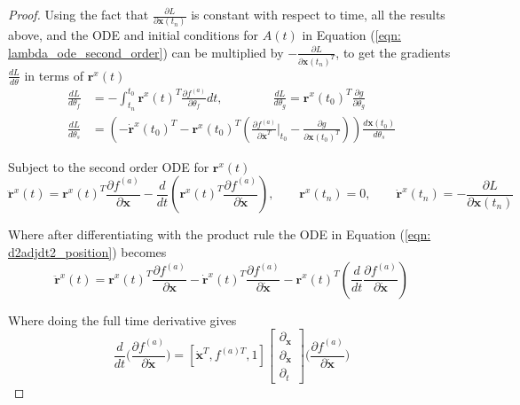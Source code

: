 \documentclass{article}
\theoremstyle{remark}
\theoremstyle{definition}
\begin{document}
\begin{proof}
Using the fact that $\displaystyle  \frac{\partial L}{\partial \mathbf{x}(t_{n})}$ is constant with respect to time, all the results above, and the ODE and initial conditions for $A(t)$ in Equation (\ref{eqn: lambda_ode_second_order}) can be multiplied by $\displaystyle -\frac{\partial L}{\partial \mathbf{x}(t_{n})^{T}}$, to get the gradients $\displaystyle  \frac{dL}{d\theta}$ in terms of $\mathbf{r}^{x}(t)$
\begin{equation}
\label{eqn: gradients_second_order_positional}
\begin{aligned}
    \frac{dL}{d\theta_{f}} &= -\int_{t_{n}}^{t_{0}}\mathbf{r}^{x}(t)^{T}
    \frac{\partial f^{(a)}}{\partial \theta_{f}}dt
    ,\qquad\qquad
    \frac{dL}{d\theta_{g}} = \mathbf{r}^{x}(t_{0})^{T}\frac{\partial g}{\partial \theta_{g}}
    \\
    \frac{dL}{d\theta_{s}} &=  \left(
    -\dot{\mathbf{r}}^{x}(t_{0})^{T} 
    - \mathbf{r}^{x}(t_{0})^{T}
    \left(
    \frac{\partial f^{(a)}}{\partial \dot{\mathbf{x}}^{T}}\Biggr\vert_{t_{0}}
    - \frac{\partial g}{\partial \mathbf{x}(t_{0})^{T}}
    \right)
    \right)\frac{d\mathbf{x}(t_{0})}{d\theta_{s}}
\end{aligned}
\end{equation}

Subject to the second order ODE for $\mathbf{r}^{x}(t)$
\begin{equation}
\label{eqn: d2adjdt2_position}
    \ddot{\mathbf{r}}^{x}(t) = \mathbf{r}^{x}(t)^{T}\frac{\partial f^{(a)}}{\partial \mathbf{x}} - \frac{d}{dt}\left(
    \mathbf{r}^{x}(t)^{T}\frac{\partial f^{(a)}}{\partial \dot{\mathbf{x}}}
    \right)
    ,\qquad
    \mathbf{r}^{x}(t_{n}) = 0
    ,\qquad
    \dot{\mathbf{r}}^{x}(t_{n}) = -\frac{\partial L}{\partial \mathbf{x}(t_{n})}
\end{equation}

Where after differentiating with the product rule the ODE in Equation (\ref{eqn: d2adjdt2_position}) becomes
\begin{equation}
\label{eqn: d2adjdt2_position_product_rule}
    \ddot{\mathbf{r}}^{x}(t) = \mathbf{r}^{x}(t)^{T}\frac{\partial f^{(a)}}{\partial \mathbf{x}}
    -\dot{\mathbf{r}}^{x}(t)^{T}\frac{\partial f^{(a)}}{\partial \dot{\mathbf{x}}}
    - \mathbf{r}^{x}(t)^{T}
    \left(
    \frac{d}{dt}\frac{\partial f^{(a)}}{\partial \dot{\mathbf{x}}}
    \right)
\end{equation}

Where doing the full time derivative gives
\begin{equation}
\label{eqn: full_time_derivative_f(a)}
    \frac{d}{dt}\Biggr(\frac{\partial f^{(a)}}{\partial \dot{\mathbf{x}}}\Biggr)=
    [\dot{\mathbf{x}}^{T}, f^{(a)T}, 1]
    \begin{bmatrix}
    \partial_{\mathbf{x}}
    \\
    \partial_{\dot{\mathbf{x}}}
    \\
    \partial_{t}
    \end{bmatrix}
    \Biggr(\frac{\partial f^{(a)}}{\partial \dot{\mathbf{x}}}\Biggr)
\end{equation}



\end{proof}
\end{document}
